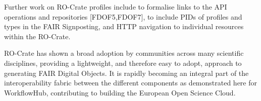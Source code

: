 Further work on RO-Crate profiles include to formalise links to the API
operations and repositories {[}FDOF5,FDOF7{]}, to include PIDs of
profiles and types in the FAIR Signposting, and HTTP navigation to
individual resources within the RO-Crate.

RO-Crate has shown a broad adoption by communities across many
scientific disciplines, providing a lightweight, and therefore easy to
adopt, approach to generating FAIR Digital Objects. It is rapidly
becoming an integral part of the interoperability fabric between the
different components as demonstrated here for WorkflowHub, contributing
to building the European Open Science Cloud.
